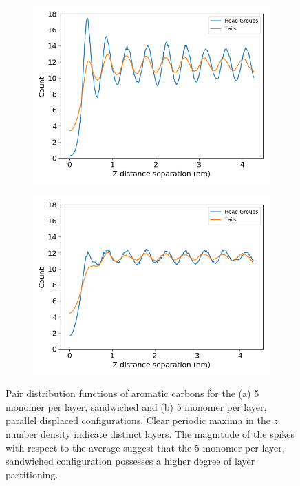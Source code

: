 \documentclass{article}
\begin{document}
  \begin{figure}
        \centering
        \begin{subfigure}{0.45\textwidth}
                \centering
                \includegraphics[width=\textwidth]{zdf_overlay_layered.png}
                \caption{}\label{fig:zdf_layered}
        \end{subfigure}
        \begin{subfigure}{0.45\textwidth}
                \centering
                \includegraphics[width=\textwidth]{zdf_overlay_offset.png}
                \caption{}\label{fig:zdf_offset}
        \end{subfigure}
        \caption{Pair distribution functions of aromatic carbons for the
        (a) 5 monomer per layer, sandwiched and (b) 5 monomer per layer,
        parallel displaced configurations. Clear periodic maxima in the
        $z$ number density indicate distinct layers. The magnitude
        of the spikes with respect to the average suggest that the 5
        monomer per layer, sandwiched configuration possesses a higher
        degree of layer partitioning.}\label{fig:zdf}
  \end{figure}
\end{document}
